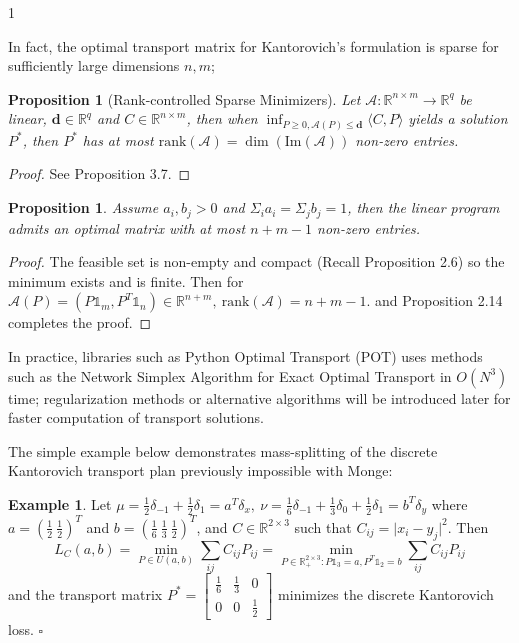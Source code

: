 \documentclass[12pt]{article}
\newtheorem{proposition}[theorem]{Proposition}
\theoremstyle{definition}
\newtheorem*{example}{Example}
\theoremstyle{plain}
\begin{document}
\begin{spacing}{1}
{In fact, the optimal transport matrix for Kantorovich's formulation is sparse for sufficiently large dimensions $n, m$; 

\begin{proposition}[Rank-controlled Sparse Minimizers]
    Let $\mathcal{A}: \mathbb{R}^{n \times m } \rightarrow \mathbb{R}^q$ be linear, $\textbf{d} \in \mathbb{R}^q$ and $C \in \mathbb{R}^{n \times m}$, then when $\inf_{P \geq 0, \mathcal{A}(P) \leq \textbf{d}} \langle C, P \rangle$ yields a solution $P^*$, then $P^*$ has at most $\text{rank}(\mathcal{A}) = \dim(\text{Im}(\mathcal{A}))$ non-zero entries.
\end{proposition}

\begin{proof}
    See \cite{peyre} Proposition 3.7.
\end{proof}

\begin{proposition}
    Assume $a_i, b_j > 0$ and $\Sigma_i a_i = \Sigma_j b_j = 1$, then the linear program admits an optimal matrix with at most $n + m - 1$ non-zero entries.
\end{proposition}

\begin{proof}
    The feasible set is non-empty and compact (Recall Proposition 2.6) so the minimum exists and is finite. Then for $\mathcal{A}(P) = (P \mathds{1}_m, P^T \mathds{1}_n) \in \mathbb{R}^{n + m}, \ \text{rank}(\mathcal{A}) = n + m - 1$. and Proposition 2.14 completes the proof.
\end{proof}

In practice, libraries such as Python Optimal Transport (POT) uses methods such as the Network Simplex Algorithm for Exact Optimal Transport in $O(N^3)$ time; regularization methods or alternative algorithms will be introduced later for faster computation of transport solutions.

\bigskip

The simple example below demonstrates mass-splitting of the discrete Kantorovich transport plan previously impossible with Monge:

\begin{example}
    Let $\mu = \frac{1}{2}\delta_{-1} + \frac{1}{2}\delta_1 = a^T \delta_x, \ \nu = \frac{1}{6}\delta_{-1} + \frac{1}{3}\delta_0 + \frac{1}{2}\delta_1 = b^T\delta_y$ where $a = (\frac{1}{2} \ \frac{1}{2})^T$ and $b = (\frac{1}{6} \ \frac{1}{3} \ \frac{1}{2})^T$, and $C \in \mathbb{R}^{2 \times 3}$ such that $C_{ij} = \lvert x_i - y_j\rvert^2$. Then
    \[
    L_C(a, b) = \min_{P \in U(a, b)} \sum_{ij}C_{ij}P_{ij} = \min_{P \in \mathbb{R}^{2 \times 3}_+: P \mathds{1}_3 = a, P^T \mathds{1}_2 = b} \sum_{ij} C_{ij} P_{ij}
    \]
    and the transport matrix $P^* = \begin{bmatrix}
        \frac{1}{6} & \frac{1}{3} & 0\\
        0 & 0 & \frac{1}{2}
    \end{bmatrix}$ minimizes the discrete Kantorovich loss. \hfill \(\square\)
\end{example}

}
\end{spacing}
\end{document}
